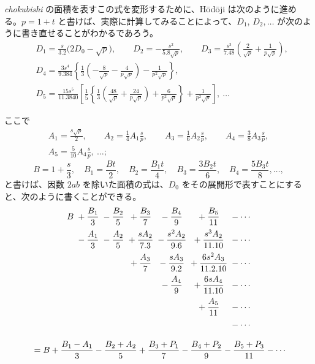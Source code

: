 \documentclass[11pt]{article}
\begin{document}
\emph{chokubishi} の面積を表すこの式を変形するために、Hōdōji は次のように進める。$p=1+t$ と書けば、実際に計算してみることによって、$D_1$, $D_2,\ldots$ が次のように書き直せることがわかるであろう。
\[
\begin{aligned}
&D_1=\frac{s}{3.2}\bigl(2D_0-\sqrt{p}\bigr),\qquad D_2=-\frac{s^2}{5.8\sqrt{p}},\qquad D_3=\frac{s^3}{7.48}\left(\frac{2}{\sqrt{p}}+\frac{1}{p\sqrt{p}}\right),\\
&D_4=\frac{3s^4}{9.384}\left\{\frac{1}{3}\left(-\frac{8}{\sqrt{p}}-\frac{4}{p\sqrt{p}}\right)-\frac{1}{p^2\sqrt{p}}\right\},\\
&D_5=\frac{15s^5}{11.3840}\left[\frac{1}{5}\left\{\frac{1}{3}\left(\frac{48}{\sqrt{p}}+\frac{24}{p\sqrt{p}}\right)+\frac{6}{p^2\sqrt{p}}\right\}+\frac{1}{p^2\sqrt{p}}\text{}\right],\ \ldots
\end{aligned}
\]

ここで
\begin{multline*}
A_1=\frac{s\sqrt{p}}{2},\qquad A_2=\frac{1}{4}A_1\frac{s}{p},\qquad A_3=\frac{1}{6}A_2\frac{s}{p},\qquad A_4=\frac{3}{8}A_3\frac{s}{p},\\
A_5=\frac{5}{10}A_4\frac{s}{p},\ \ldots;
\end{multline*}
\[
B=1+\frac{s}{3},\quad B_1=\frac{Bt}{2},\quad B_2=\frac{B_1t}{4},\quad B_3=\frac{3B_2t}{6},\quad B_4=\frac{5B_3t}{8},\ldots,
\]
と書けば、因数 $2ab$ を除いた面積の式は、$D_0$ をその展開形で表すことにすると、次のように書くことができる。
\begin{gather*}
\begin{array}{r@{\;}c@{\;}c@{\;}c@{\;}c@{\;}c@{\;}l}
B & {}+\dfrac{B_1}{3} & {}-\dfrac{B_2}{5} & {}+\dfrac{B_3}{7} & {}-\dfrac{B_4}{9} & {}+\dfrac{B_5}{11} & {}-\cdots\\[3mm]
 & {}-\dfrac{A_1}{3} & {}-\dfrac{A_2}{5} & {}+\dfrac{sA_2}{7.3} & {}-\dfrac{s^2A_2}{9.6} & {}+\dfrac{s^3A_2}{11.10} & {}-\cdots\\[3mm]
 & & & {}+\dfrac{A_3}{7} & {}-\dfrac{sA_3}{9.2} & {}+\dfrac{6s^2A_3}{11.2.10} & {}-\cdots\\[3mm]
 & & & & {}-\dfrac{A_4}{9} & {}+\dfrac{6sA_4}{11.10} & {}-\cdots\\[3mm]
 & & & & & {}+\dfrac{A_5}{11} & {}-\cdots\\[3mm]
 & & & & & & {}-\cdots
\end{array}\\[3mm]
{}=B+\frac{B_1-A_1}{3}-\frac{B_2+A_2}{5}+\frac{B_3+P_1}{7}-\frac{B_4+P_2}{9}-\frac{B_5+P_3}{11}-\cdots
\end{gather*}
\end{document}
